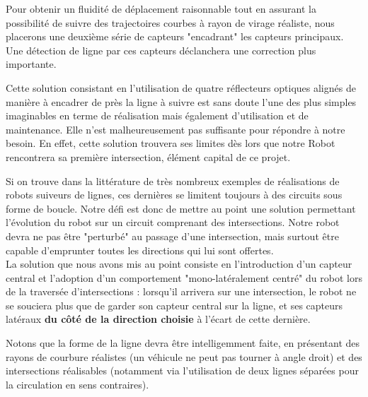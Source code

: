 		Pour obtenir un fluidité de déplacement raisonnable tout en assurant la possibilité de suivre des trajectoires courbes à rayon de virage réaliste, nous placerons une deuxième série de capteurs "encadrant" les capteurs principaux. Une détection de ligne par ces capteurs déclanchera une correction plus importante.


		Cette solution consistant en l'utilisation de quatre réflecteurs optiques alignés de manière à encadrer de près la ligne à suivre est sans doute l'une des plus simples imaginables en terme de réalisation mais également d'utilisation et de maintenance.
		Elle n'est malheureusement pas suffisante pour répondre à notre besoin. En effet, cette solution trouvera ses limites dès lors que notre Robot rencontrera sa première intersection, élément capital de ce projet.\\


		Si on trouve dans la littérature de très nombreux exemples de réalisations de robots suiveurs de lignes, ces dernières se limitent toujours à des circuits sous forme de boucle. Notre défi est donc de mettre au point une solution permettant l'évolution du robot sur un circuit comprenant des intersections. Notre robot devra ne pas être "perturbé" au passage d'une intersection, mais surtout être capable d'emprunter toutes les directions qui lui sont offertes.\\

		La solution que nous avons mis au point consiste en l'introduction d'un capteur central et l'adoption d'un comportement "mono-latéralement centré" du robot lors de la traversée d'intersections : lorsqu'il arrivera sur une intersection, le robot ne se souciera plus que de garder son capteur central sur la ligne, et ses capteurs latéraux \textbf{du côté de la direction choisie} à l'écart de cette dernière.


		Notons que la forme de la ligne devra être intelligemment faite, en présentant des rayons de courbure réalistes (un véhicule ne peut pas tourner à angle droit) et des intersections réalisables (notamment via l'utilisation de deux lignes séparées pour la circulation en sens contraires).\\


